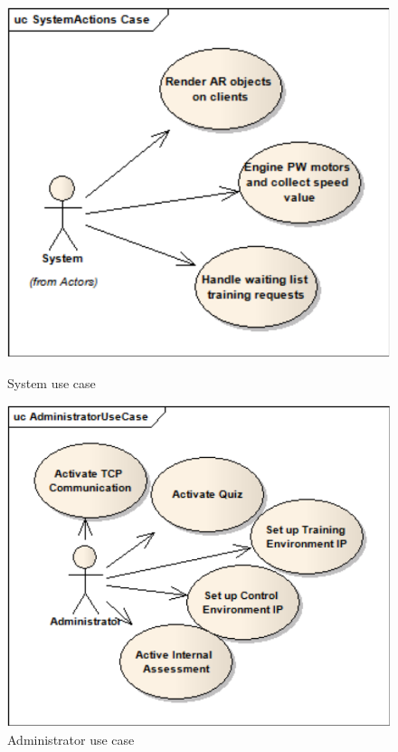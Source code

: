 \begin{figure}[!htbp]
\center
\begin{minipage}{0.45\linewidth}
\center
\captionsetup{justification=centering,margin=0.5cm,font=small}
\includegraphics[width=0.93\linewidth]{img/cap4/systemActionsCase}
\caption{System use case} \label{fig:systemActionsCase}
\end{minipage}
\begin{minipage}{0.45\linewidth}
\center
\captionsetup{justification=centering,margin=0cm,font=small}
\includegraphics[width=1\linewidth]{img/cap4/adminCase}
\caption{Administrator use case} \label{fig:adminCase}
\end{minipage}
\end{figure}


